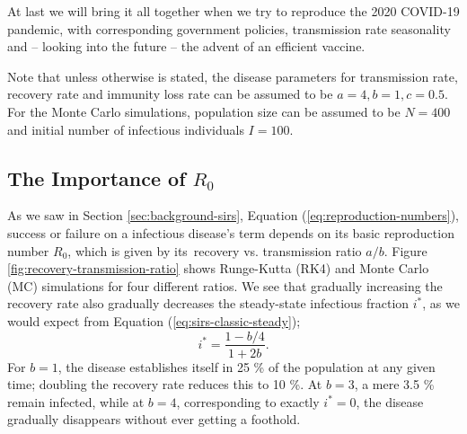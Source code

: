 \documentclass[]{article}
\begin{document}
At last we will bring it all together when we try to reproduce the 2020 COVID-19 pandemic, with corresponding government policies, transmission rate seasonality and -- looking into the future -- the advent of an efficient vaccine.

Note that unless otherwise is stated, the disease parameters for transmission rate, recovery rate and immunity loss rate can be assumed to be $a=4, b=1, c=0.5$. For the Monte Carlo simulations, population size can be assumed to be $N=400$ and initial number of infectious individuals $I=100$.

\subsection{The Importance of $R_0$} \label{sec:recovery-rates}

As we saw in Section \ref{sec:background-sirs}, Equation (\ref{eq:reproduction-numbers}), success or failure on a infectious disease's term depends on its basic reproduction number $R_0$, which is given by its recovery vs. transmission ratio $a/b$. Figure \ref{fig:recovery-transmission-ratio} shows Runge-Kutta (RK4) and Monte Carlo (MC) simulations for four different ratios. We see that gradually increasing the recovery rate also gradually decreases the steady-state infectious fraction $i^*$, as we would expect from Equation (\ref{eq:sirs-classic-steady});
\begin{equation}
	i^* = \frac{1 - b/4}{1 + 2b}.
\end{equation}
For $b = 1$, the disease establishes itself in 25 \% of the population at any given time; doubling the recovery rate reduces this to 10 \%. At $b = 3$, a mere 3.5 \% remain infected, while at $b = 4$, corresponding to exactly $i^* = 0$, the disease gradually disappears without ever getting a foothold.
\end{document}
